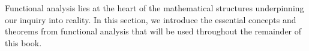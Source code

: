 Functional analysis lies at the heart of the mathematical structures underpinning our inquiry into reality. 
In this section, we introduce the essential concepts and theorems from functional analysis that will be used throughout the remainder of this book.